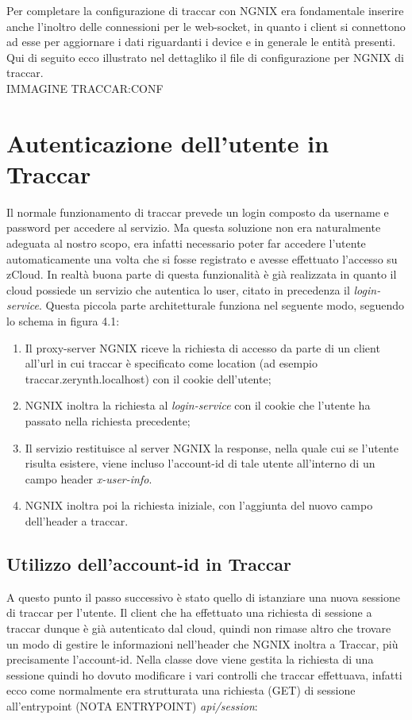\documentclass[a4paper,titlepage,12pt]{book}
\begin{document}
Per completare la configurazione di traccar con NGNIX era fondamentale inserire anche l'inoltro delle connessioni per le web-socket, in quanto i client si connettono ad esse per aggiornare i dati riguardanti i device e in generale le entità presenti. Qui di seguito ecco illustrato nel dettagliko il file di configurazione per NGNIX di traccar.\\
IMMAGINE TRACCAR:CONF\\

\section{\sffamily
Autenticazione dell'utente in Traccar}
Il normale funzionamento di traccar prevede un login composto da username e password per accedere al servizio. Ma questa soluzione non era naturalmente adeguata al nostro scopo, era infatti necessario poter far accedere l'utente automaticamente una volta che si fosse registrato e avesse effettuato l'accesso su zCloud. In realtà buona parte di questa funzionalità è già realizzata in quanto il cloud possiede un servizio che autentica lo user, citato in precedenza il \textit{login-service}. Questa piccola parte architetturale funziona nel seguente modo, seguendo lo schema in figura 4.1:\\
\begin{enumerate}
\item Il proxy-server NGNIX riceve la richiesta di accesso da parte di un client all'url in cui traccar è specificato come location (ad esempio traccar.zerynth.localhost) con il cookie dell'utente;
\item NGNIX inoltra la richiesta al \textit{login-service} con il cookie che l'utente ha passato nella richiesta precedente;
\item Il servizio restituisce al server NGNIX la response, nella quale cui se l'utente risulta esistere, viene incluso l'account-id di tale utente all'interno di un campo header \textit{x-user-info}.
\item NGNIX inoltra poi la richiesta iniziale, con l'aggiunta del nuovo campo dell'header a traccar.
\end{enumerate}


\subsection{\sffamily
Utilizzo dell'account-id in Traccar}
A questo punto il passo successivo è stato quello di istanziare una nuova sessione di traccar per l'utente. Il client che ha effettuato una richiesta di sessione a traccar dunque è già autenticato dal cloud, quindi non rimase altro che trovare un modo di gestire le informazioni nell'header che NGNIX  inoltra a Traccar, più precisamente l'account-id. Nella classe dove viene gestita la richiesta di una sessione quindi ho dovuto modificare i vari controlli che traccar effettuava, infatti ecco come normalmente era strutturata una richiesta (GET) di sessione all'entrypoint (NOTA ENTRYPOINT) \textit{api/session}:\par\medskip
\end{document}
